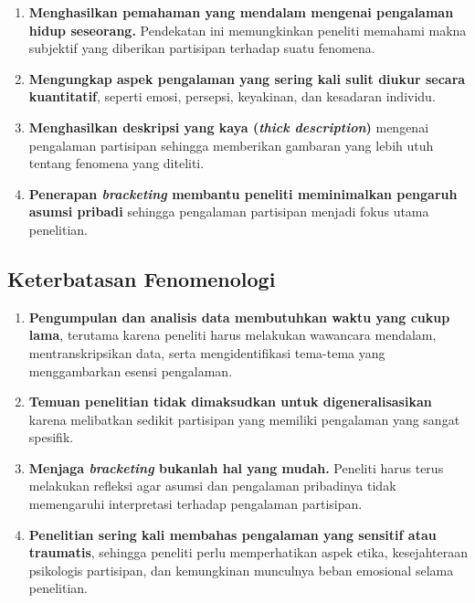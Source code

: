\documentclass[
  indonesian,
  letterpaper,
  DIV=11,
  numbers=noendperiod]{scrreprt}
\providecommand{\tightlist}{%
  \setlength{\itemsep}{0pt}\setlength{\parskip}{0pt}}
\begin{document}
\begin{enumerate}
\def\labelenumi{\alph{enumi}.}
\tightlist
\item
  \textbf{Menghasilkan pemahaman yang mendalam mengenai pengalaman hidup
  seseorang.} Pendekatan ini memungkinkan peneliti memahami makna
  subjektif yang diberikan partisipan terhadap suatu fenomena.
\item
  \textbf{Mengungkap aspek pengalaman yang sering kali sulit diukur
  secara kuantitatif}, seperti emosi, persepsi, keyakinan, dan kesadaran
  individu.
\item
  \textbf{Menghasilkan deskripsi yang kaya (\emph{thick description})}
  mengenai pengalaman partisipan sehingga memberikan gambaran yang lebih
  utuh tentang fenomena yang diteliti.
\item
  \textbf{Penerapan \emph{bracketing} membantu peneliti meminimalkan
  pengaruh asumsi pribadi} sehingga pengalaman partisipan menjadi fokus
  utama penelitian.
\end{enumerate}

\subsection{Keterbatasan Fenomenologi}\label{keterbatasan-fenomenologi}

\begin{enumerate}
\def\labelenumi{\alph{enumi}.}
\tightlist
\item
  \textbf{Pengumpulan dan analisis data membutuhkan waktu yang cukup
  lama}, terutama karena peneliti harus melakukan wawancara mendalam,
  mentranskripsikan data, serta mengidentifikasi tema-tema yang
  menggambarkan esensi pengalaman.
\item
  \textbf{Temuan penelitian tidak dimaksudkan untuk digeneralisasikan}
  karena melibatkan sedikit partisipan yang memiliki pengalaman yang
  sangat spesifik.
\item
  \textbf{Menjaga \emph{bracketing} bukanlah hal yang mudah.} Peneliti
  harus terus melakukan refleksi agar asumsi dan pengalaman pribadinya
  tidak memengaruhi interpretasi terhadap pengalaman partisipan.
\item
  \textbf{Penelitian sering kali membahas pengalaman yang sensitif atau
  traumatis}, sehingga peneliti perlu memperhatikan aspek etika,
  kesejahteraan psikologis partisipan, dan kemungkinan munculnya beban
  emosional selama penelitian.
\end{enumerate}
\end{document}
